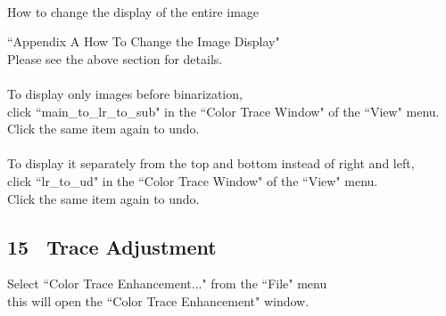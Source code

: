 \documentclass[a4paper,10pt]{article}
\begin{document}
\\
How to change the display of the entire image\par
“Appendix A How To Change the Image Display"\\
Please see the above section for details.\\
\\
To display only images before binarization,\\
click “main\_to\_lr\_to\_sub" in the “Color Trace Window" of the “View" menu.\\
Click the same item again to undo.\\
\\
To display it separately from the top and bottom instead of right and left,\\
click “lr\_to\_ud" in the “Color Trace Window" of the “View" menu.\\
Click the same item again to undo.\\

\newpage

\subsection*{15 \ Trace Adjustment}

\noindent Select “Color Trace Enhancement..." from the “File" menu\\
this will open the “Color Trace Enhancement" window.
\end{document}
